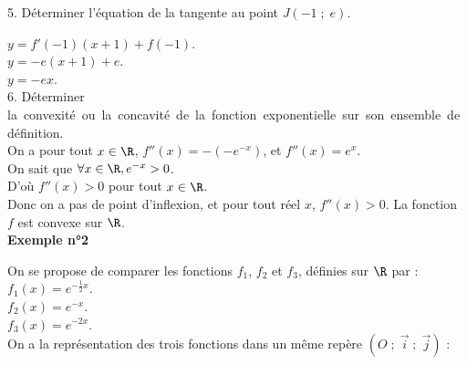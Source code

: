5. Déterminer l'équation de la tangente au point $J\left(-1\; ; \; e\right)$. \\

\vspace*{-.2cm}

$y = f'(-1)(x+1) + f(-1)$. \\
$y = -e\left(x+1\right) + e$. \\
$y = -ex$. \\

6. Déterminer \hbox{la convexité ou la concavité de la fonction exponentielle sur son ensemble de définition.} \\

On a pour tout $x \in \R$, $f''(x) = -\left(-e^{-x}\right)$, et $f''(x) = e^x$. \\

On sait que $\forall x \in \R, e^{-x} > 0$. \\

D'où $f''(x) > 0$ pour tout $x \in \R$. \\

Donc on a pas de point d'inflexion, et pour tout réel $x$, $f''(x) > 0$. La fonction $f$ est convexe sur $\R$. \\

\textbf{Exemple n°2}

On se propose de comparer les fonctions $f_1$, $f_2$ et $f_3$, définies sur $\R$ par : \\

$f_1\left(x\right) = e^{-\frac{1}{2}x}$. \\
$f_2\left(x\right) = e^{-x}$. \\
$f_3\left(x\right) = e^{-2x}$. \\

On a la représentation des trois fonctions dans un même repère $\left(O \; ; \; \overrightarrow{i} \; ; \; \overrightarrow{j}\right)$ : \\

